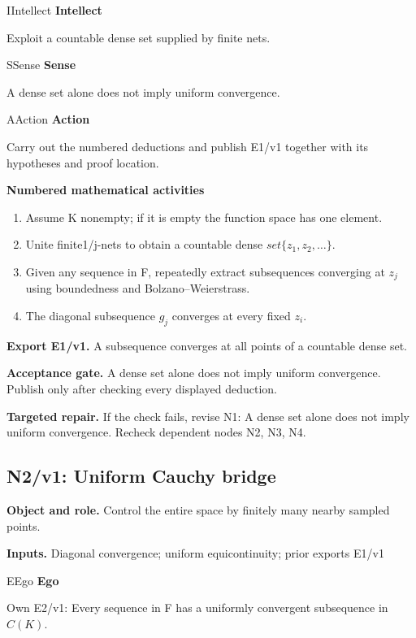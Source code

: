\documentclass[preprint,12pt,aps,pra,showkeys,amsmath,amssymb,superscriptaddress,floatfix]{revtex4-2}
\theoremstyle{definition}
\theoremstyle{remark}
\newcommand{\mmfaculty}[3]{%
 \begin{mmfacultybox}{#1}{#2}
 {\sffamily\bfseries\color{MMBlue}#2}\par\smallskip #3
 \end{mmfacultybox}}
\newcommand{\field}[2]{\par\smallskip\noindent\textbf{#1.} #2\par}
\begin{document}
\mmfaculty{I}{Intellect}{Exploit a countable dense set supplied by finite nets.}

\mmfaculty{S}{Sense}{A dense set alone does not imply uniform convergence.}

\mmfaculty{A}{Action}{Carry out the numbered deductions and publish E1/v1 together with its
hypotheses and proof location.}

\smallskip\noindent\textbf{Numbered mathematical activities}

\begin{enumerate}[label=N1.\arabic*,leftmargin=3.4em]

\item Assume K nonempty; if it is empty the function space has one element.

\item Unite finite1/j-nets to obtain a countable dense
\(set\{z_{1},z_{2},\ldots \}\).

\item Given any sequence in F, repeatedly extract subsequences converging at
\(z_j\) using boundedness and Bolzano--Weierstrass.

\item The diagonal subsequence \(g_j\) converges at every fixed \(z_i\).

\end{enumerate}

\field{Export E1/v1}{A subsequence converges at all points of a countable dense set.}

\field{Acceptance gate}{A dense set alone does not imply uniform convergence. Publish only after
checking every displayed deduction.}

\field{Targeted repair}{If the check fails, revise N1: A dense set alone does not imply uniform
convergence. Recheck dependent nodes N2, N3, N4.}

\clearpage

\subsection{N2/v1: Uniform Cauchy bridge}

\field{Object and role}{Control the entire space by finitely many nearby sampled points.}

\field{Inputs}{Diagonal convergence; uniform equicontinuity; prior exports E1/v1}

\mmfaculty{E}{Ego}{Own E2/v1: Every sequence in F has a uniformly convergent subsequence in
\(C(K)\).}
\end{document}

